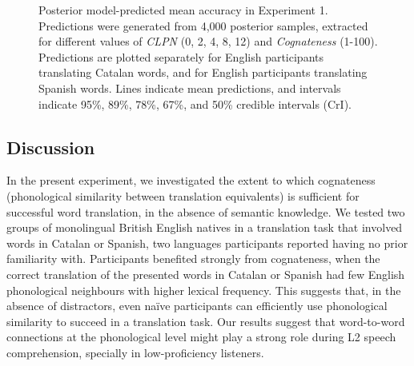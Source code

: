 \documentclass[
]{article}
\begin{document}
\begin{figure}


\caption{\label{fig-epreds-1}Posterior model-predicted mean accuracy in
Experiment 1. Predictions were generated from 4,000 posterior samples,
extracted for different values of \emph{CLPN} (0, 2, 4, 8, 12) and
\emph{Cognateness} (1-100). Predictions are plotted separately for
English participants translating Catalan words, and for English
participants translating Spanish words. Lines indicate mean predictions,
and intervals indicate 95\%, 89\%, 78\%, 67\%, and 50\% credible
intervals (CrI).}

\end{figure}%

\subsection{Discussion}\label{discussion}

In the present experiment, we investigated the extent to which
cognateness (phonological similarity between translation equivalents) is
sufficient for successful word translation, in the absence of semantic
knowledge. We tested two groups of monolingual British English natives
in a translation task that involved words in Catalan or Spanish, two
languages participants reported having no prior familiarity with.
Participants benefited strongly from cognateness, when the correct
translation of the presented words in Catalan or Spanish had few English
phonological neighbours with higher lexical frequency. This suggests
that, in the absence of distractors, even naïve participants can
efficiently use phonological similarity to succeed in a translation
task. Our results suggest that word-to-word connections at the
phonological level might play a strong role during L2 speech
comprehension, specially in low-proficiency listeners.
\end{document}
